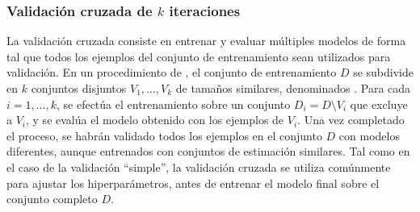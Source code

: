 %
\subsubsection{Validación cruzada de $k$ iteraciones}
%
La validación cruzada consiste en entrenar y evaluar 
múltiples modelos de forma tal que todos los ejemplos del conjunto de
entrenamiento sean utilizados para validación.
En un procedimiento de 
\cite{crossval}, el conjunto de entrenamiento $D$ se subdivide en $k$
conjuntos disjuntos $V_1,\ldots,V_k$ de tamaños similares, denominados
.
Para cada $i=1,\ldots,k$, se efectúa el entrenamiento sobre un
conjunto $D_i=D\setminus{}V_i$ que excluye a $V_i$, y se evalúa el
modelo obtenido con los ejemplos de $V_i$.
Una vez completado el proceso, se habrán validado todos los ejemplos en
el conjunto $D$ con modelos diferentes, aunque entrenados con conjuntos
de estimación similares.
Tal como en el caso de la validación ``simple'', la validación cruzada
se utiliza comúnmente para ajustar los hiperparámetros, antes de
entrenar el modelo final sobre el conjunto completo $D$.
